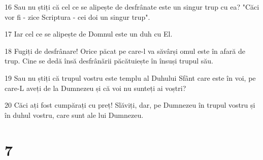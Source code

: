 \par 16 Sau nu știți că cel ce se alipește de desfrânate este un singur trup cu ea? "Căci vor fi - zice Scriptura - cei doi un singur trup".
\par 17 Iar cel ce se alipește de Domnul este un duh cu El.
\par 18 Fugiți de desfrânare! Orice păcat pe care-l va săvârși omul este în afară de trup. Cine se dedă însă desfrânării păcătuiește în însuși trupul său.
\par 19 Sau nu știți că trupul vostru este templu al Duhului Sfânt care este în voi, pe care-L aveți de la Dumnezeu și că voi nu sunteți ai voștri?
\par 20 Căci ați fost cumpărați cu preț! Slăviți, dar, pe Dumnezeu în trupul vostru și în duhul vostru, care sunt ale lui Dumnezeu.

\chapter{7}

